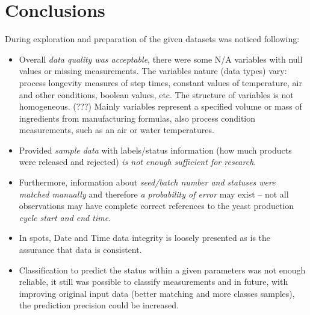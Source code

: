 \section{Conclusions}
During exploration and preparation of the given datasets was noticed following:
\begin{itemize}
    \item Overall \emph{data quality was acceptable}, there were some N/A variables with null values or missing measurements. The variables nature (data types) vary: process longevity measures of step times, constant values of temperature, air and other conditions, boolean values, etc. The structure of variables is not homogeneous. (???) Mainly variables represent a specified volume or mass of ingredients from manufacturing formulas, also process condition measurements, such as an air or water temperatures.
    \item Provided \emph{sample data} with labels/status information (how much products were released and rejected) \emph{is not enough sufficient for research}. 
    
    \item Furthermore, information about \emph{seed/batch number and statuses were \\ matched manually} and therefore \emph{a probability of error} may exist – not all observations may have complete correct references to the yeast production \emph{cycle start and end time}.
    \item In spots, Date and Time data integrity is loosely presented as is the assurance that data is consistent.
    \item Classification to predict the status within a given parameters was not enough reliable, it still was possible to classify measurements and in future, with improving original input data (better matching and more classes samples), the prediction precision could be increased.  
\end{itemize}